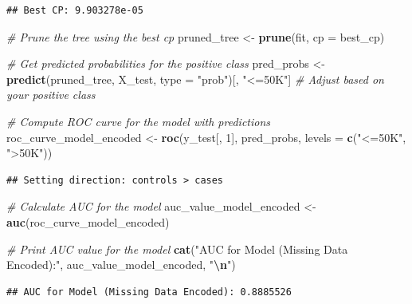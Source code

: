 \documentclass[
]{article}
\newenvironment{Shaded}{\begin{snugshade}}{\end{snugshade}}
\newcommand{\AttributeTok}[1]{\textcolor[rgb]{0.13,0.29,0.53}{#1}}
\newcommand{\CommentTok}[1]{\textcolor[rgb]{0.56,0.35,0.01}{\textit{#1}}}
\newcommand{\DecValTok}[1]{\textcolor[rgb]{0.00,0.00,0.81}{#1}}
\newcommand{\FunctionTok}[1]{\textcolor[rgb]{0.13,0.29,0.53}{\textbf{#1}}}
\newcommand{\NormalTok}[1]{#1}
\newcommand{\OtherTok}[1]{\textcolor[rgb]{0.56,0.35,0.01}{#1}}
\newcommand{\SpecialCharTok}[1]{\textcolor[rgb]{0.81,0.36,0.00}{\textbf{#1}}}
\newcommand{\StringTok}[1]{\textcolor[rgb]{0.31,0.60,0.02}{#1}}
\begin{document}
\begin{verbatim}
## Best CP: 9.903278e-05
\end{verbatim}

\begin{Shaded}
\begin{Highlighting}[]
\CommentTok{\# Prune the tree using the best cp}
\NormalTok{pruned\_tree }\OtherTok{\textless{}{-}} \FunctionTok{prune}\NormalTok{(fit, }\AttributeTok{cp =}\NormalTok{ best\_cp)}

\CommentTok{\# Get predicted probabilities for the positive class}
\NormalTok{pred\_probs }\OtherTok{\textless{}{-}} \FunctionTok{predict}\NormalTok{(pruned\_tree, X\_test, }\AttributeTok{type =} \StringTok{"prob"}\NormalTok{)[, }\StringTok{"\textless{}=50K"}\NormalTok{]  }\CommentTok{\# Adjust based on your positive class}

\CommentTok{\# Compute ROC curve for the model with predictions}
\NormalTok{roc\_curve\_model\_encoded }\OtherTok{\textless{}{-}} \FunctionTok{roc}\NormalTok{(y\_test[, }\DecValTok{1}\NormalTok{], pred\_probs, }\AttributeTok{levels =} \FunctionTok{c}\NormalTok{(}\StringTok{"\textless{}=50K"}\NormalTok{, }\StringTok{"\textgreater{}50K"}\NormalTok{))}
\end{Highlighting}
\end{Shaded}

\begin{verbatim}
## Setting direction: controls > cases
\end{verbatim}

\begin{Shaded}
\begin{Highlighting}[]
\CommentTok{\# Calculate AUC for the model}
\NormalTok{auc\_value\_model\_encoded }\OtherTok{\textless{}{-}} \FunctionTok{auc}\NormalTok{(roc\_curve\_model\_encoded)}

\CommentTok{\# Print AUC value for the model}
\FunctionTok{cat}\NormalTok{(}\StringTok{"AUC for Model (Missing Data Encoded):"}\NormalTok{, auc\_value\_model\_encoded, }\StringTok{"}\SpecialCharTok{\textbackslash{}n}\StringTok{"}\NormalTok{)}
\end{Highlighting}
\end{Shaded}

\begin{verbatim}
## AUC for Model (Missing Data Encoded): 0.8885526
\end{verbatim}

\begin{Shaded}
\end{Shaded}
\end{document}
